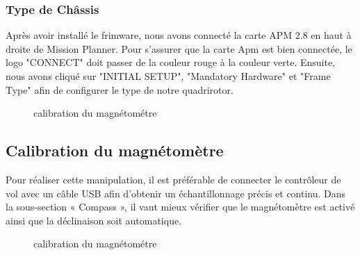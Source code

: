 \documentclass[a4paper,12pt]{book}
\begin{document}
\subsubsection{Type de Châssis}
Après avoir installé le frimware, nous avons connecté  la carte APM 2.8 en haut à droite de Mission Planner. Pour s'assurer que la carte Apm est bien connectée, le logo "CONNECT" doit passer de la couleur rouge à la couleur verte. Ensuite, nous avons cliqué sur "INITIAL SETUP", "Mandatory Hardware" et "Frame Type" afin de  configurer le type de notre quadrirotor. 
\begin{figure}[h]
	\begin{center}
		\centering
	\end{center}
	\caption{calibration du magnétométre}
\end{figure}
\subsection{Calibration du magnétomètre}
Pour réaliser cette manipulation, il est préférable de connecter le contrôleur de vol avec un câble USB afin d’obtenir un échantillonnage précis et continu.
Dans la sous-section « Compass », il vaut mieux vérifier que le magnétomètre est activé ainsi que la déclinaison soit automatique.

\begin{figure}[h]
	\begin{center}
		\centering
	\end{center}
	\caption{calibration du magnétométre}
\end{figure}
\end{document}
